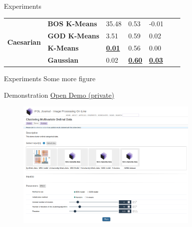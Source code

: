 \documentclass{beamer}
\begin{document}
\begin{frame}{Experiments}
\begin{table}
\begin{adjustbox}{width=.7\columnwidth}
\begin{tabular}{lllllll}
                \multirow[t]{6}{*}{\textbf{Caesarian}}      & \textbf{BOS K-Means} & 35.48                     & 0.53                      & -0.01                     \\
                \textbf{}                                   & \textbf{GOD K-Means} & 3.51                      & 0.59                      & 0.02                      \\
                \textbf{}                                   & \textbf{K-Means}     & \textbf{\underline{0.01}} & 0.56                      & 0.00                      \\
                \textbf{}                                   & \textbf{Gaussian}    & 0.02                      & \textbf{\underline{0.60}} & \textbf{\underline{0.03}} \\
                \cline{1-5}
            \end{tabular}
        \end{adjustbox}
        \label{tab:results_real}
    \end{table}

\end{frame}


\begin{frame}{Experiments}
    Some more figure
\end{frame}

\begin{frame}{Demonstration}
    \hyperlink{https://ipolcore.ipol.im/demo/clientApp/demo.html?id=77777000487}{Open Demo (private)}
    \begin{figure}
        \includegraphics[width=0.8\textwidth]{Attachments/demo.png}
    \end{figure}
\end{frame}
\end{document}
